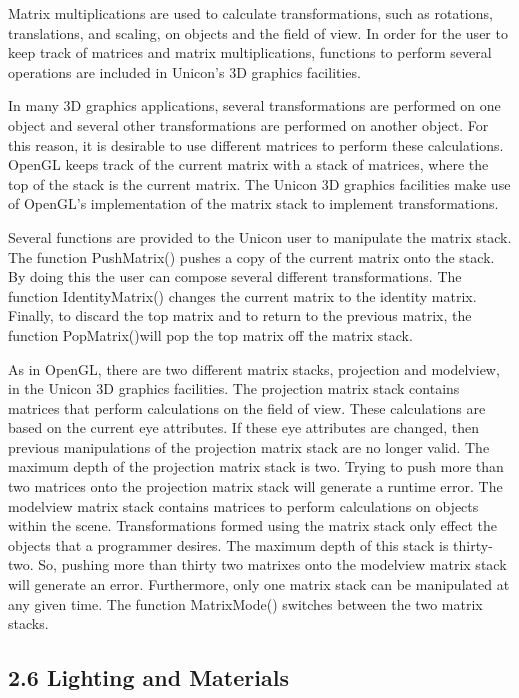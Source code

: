 \documentclass[letterpaper]{article}
\begin{document}
Matrix multiplications are used to calculate transformations, such as
rotations, translations, and scaling, on objects and the field of
view. In order for the user to keep track of matrices and matrix
multiplications, functions to perform several operations are included
in Unicon's 3D graphics facilities.

In many 3D graphics applications, several transformations are
performed on one object and several other transformations are
performed on another object. For this reason, it is desirable to use
different matrices to perform these calculations. OpenGL keeps track
of the current matrix with a stack of matrices, where the top of the
stack is the current matrix. The Unicon 3D graphics facilities make
use of OpenGL's implementation of the matrix stack to implement
transformations.

{
Several functions are provided to the Unicon user to manipulate the matrix stack. The function \textsf{PushMatrix()}
pushes a copy of the current matrix onto the stack. By doing this the user can compose several different
transformations. The function \textsf{IdentityMatrix()} changes the current matrix to the identity matrix. Finally, to
discard the top matrix and to return to the previous matrix, the function \textsf{PopMatrix()}will pop the top matrix
off the matrix stack. }

As in OpenGL, there are two different matrix stacks, projection and
modelview, in the Unicon 3D graphics facilities. The projection matrix
stack contains matrices that perform calculations on the field of
view. These calculations are based on the current eye attributes. If
these eye attributes are changed, then previous manipulations of the
projection matrix stack are no longer valid. The maximum depth of the
projection matrix stack is two. Trying to push more than two matrices
onto the projection matrix stack will generate a runtime error. The
modelview matrix stack contains matrices to perform calculations on
objects within the scene. Transformations formed using the matrix
stack only effect the objects that a programmer desires. The maximum
depth of this stack is thirty-two. So, pushing more than thirty two
matrixes onto the modelview matrix stack will generate an
error. Furthermore, only one matrix stack can be manipulated at any
given time. The function \textsf{MatrixMode() }switches between the
two matrix stacks.

\subsection[2.6 Lighting and Materials]{2.6 Lighting and Materials}
\end{document}
